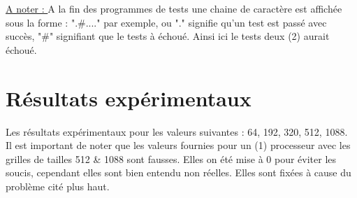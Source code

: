 \documentclass[10pt,a4paper]{article}
\begin{document}
\underline{A noter : } A la fin des programmes de tests une chaine de caractère est affichée sous la forme : ".\#...." par exemple, ou "." signifie qu'un test est passé avec succès, "\#" signifiant que le tests à échoué. Ainsi ici le tests deux (2) aurait échoué.

\section{Résultats expérimentaux}

Les résultats expérimentaux pour les valeurs suivantes : 64, 192, 320, 512, 1088. \\

Il est important de noter que les valeurs fournies pour un (1) processeur avec les grilles de tailles 512 \& 1088 sont fausses. Elles on été mise à 0 pour éviter les soucis, cependant elles sont bien entendu non réelles. Elles sont fixées à cause du problème cité plus haut.\\
\end{document}
